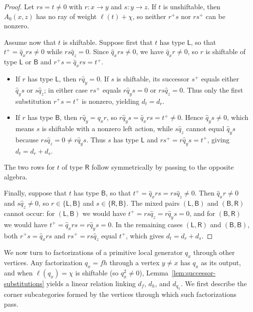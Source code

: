 \begin{proof}
Let $rs=t\ne0$ with $r\colon x\to y$ and $s\colon y\to z$. If $t$ is unshiftable, then $A_0(x,z)$ has no ray of weight $\ell(t)+\chi$, so neither $r^+s$ nor $rs^+$ can be nonzero.

Assume now that $t$ is shiftable. Suppose first that $t$ has type $\mathsf L$, so that $t^+=\widehat q_xrs\ne0$ while $rs\widehat q_z=0$. Since $\widehat q_xrs\ne0$, we have $\widehat q_xr\ne0$, so $r$ is shiftable of type $\mathsf L$ or $\mathsf B$ and $r^+s=\widehat q_xrs=t^+$.
\begin{itemize}
\item If $r$ has type $\mathsf L$, then $r\widehat q_y=0$. If $s$ is shiftable, its successor $s^+$ equals either $\widehat q_ys$ or $s\widehat q_z$; in either case $rs^+$ equals $r\widehat q_ys=0$ or $rs\widehat q_z=0$. Thus only the first substitution $r^+s=t^+$ is nonzero, yielding $d_t=d_r$.
\item If $r$ has type $\mathsf B$, then $r\widehat q_y=\widehat q_xr$, so $r\widehat q_ys=\widehat q_xrs=t^+\ne0$. Hence $\widehat q_ys\ne0$, which means $s$ is shiftable with a nonzero left action, while $s\widehat q_z$ cannot equal $\widehat q_ys$ because $rs\widehat q_z=0\ne r\widehat q_ys$. Thus $s$ has type $\mathsf L$ and $rs^+=r\widehat q_ys=t^+$, giving $d_t=d_r+d_s$.
\end{itemize}
The two rows for $t$ of type $\mathsf R$ follow symmetrically by passing to the opposite algebra.

Finally, suppose that $t$ has type $\mathsf B$, so that $t^+=\widehat q_xrs=rs\widehat q_z\ne0$. Then $\widehat q_xr\ne0$ and $s\widehat q_z\ne0$, so $r\in\{\mathsf L,\mathsf B\}$ and $s\in\{\mathsf R,\mathsf B\}$. The mixed pairs $(\mathsf L,\mathsf B)$ and $(\mathsf B,\mathsf R)$ cannot occur: for $(\mathsf L,\mathsf B)$ we would have $t^+=rs\widehat q_z=r\widehat q_ys=0$, and for $(\mathsf B,\mathsf R)$ we would have $t^+=\widehat q_xrs=r\widehat q_ys=0$. In the remaining cases $(\mathsf L,\mathsf R)$ and $(\mathsf B,\mathsf B)$, both $r^+s=\widehat q_xrs$ and $rs^+=rs\widehat q_z$ equal $t^+$, which gives $d_t=d_r+d_s$.
\end{proof}

We now turn to factorizations of a primitive local generator $q_x$ through other vertices. Any factorization $q_x=fh$ through a vertex $y\ne x$ has $q_x$ as its output, and when $\ell(q_x)=\chi$ is shiftable (so $q_x^2\ne0$), Lemma~\ref{lem:successor-substitutions} yields a linear relation linking $d_f$, $d_h$, and $d_{q_x}$. We first describe the corner subcategories formed by the vertices through which such factorizations pass.

